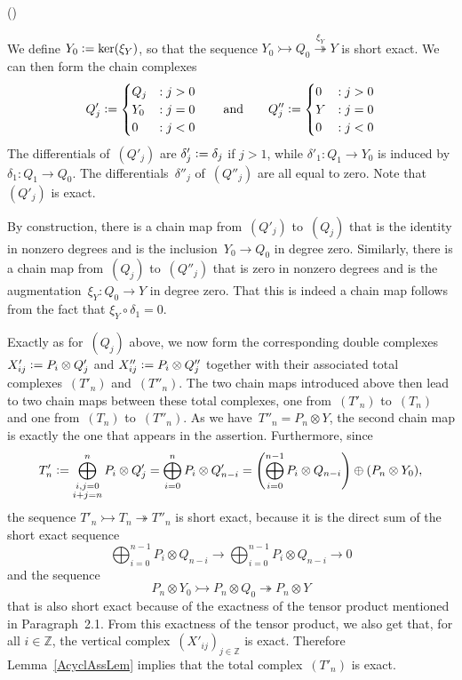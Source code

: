 \documentclass[12pt]{article}
\makeatletter
\newcounter{num}
\newenvironment{pflist}{\begin{list}{(\arabic{num})}{\usecounter{num} \leftmargin0cm \itemindent5pt}}{\end{list}}
\theoremstyle{definition}
\theoremstyle{break}
\renewenvironment{proof}[1][\proofname]{\par
\vspace{-5pt}%
\pushQED{\qed}%
\normalfont
\topsep0pt \partopsep0pt %
\trivlist
\item[\hskip\labelsep
\bfseries
#1\@addpunct{.}]\ignorespaces
}{%
\popQED\endtrivlist\@endpefalse
\addvspace{6pt plus 6pt} %
}
\newcommand{\Z}{\mathbb{Z}}
\renewcommand{\1}{\mathbbm{1}}
\newcommand{\ot}{\mathbin{\otimes}}
\newcommand{\deq}{\vcentcolon =}
\makeatother
\begin{document}
\begin{proof}
\begin{pflist}
\item
We define $Y_0 \deq \ker(\xi_Y)$, so that the sequence
$Y_0 \rightarrowtail Q_0 \overset{\xi_Y}{\twoheadrightarrow} Y$
is short exact. We can then form the chain complexes
\[
Q'_j \deq
\begin{cases}
Q_{j} &: j > 0 \\
Y_0 &: j = 0 \\
0 &: j < 0
\end{cases}
\qquad \text{and} \qquad
Q''_j \deq
\begin{cases}
0 &: j > 0 \\
Y &: j = 0 \\
0 &: j < 0
\end{cases}
\]
The differentials of~$(Q'_j)$ are $\delta'_j \deq \delta_j$ if $j > 1$, while $\delta'_1 \colon Q_1 \to Y_0$ is induced by $\delta_1 \colon Q_1 \to Q_0$. The differentials~$\delta''_j$ of~$(Q''_j)$ are all equal to zero. Note that~$(Q'_j)$ is exact.

By construction, there is a chain map from~$(Q'_j)$ to~$(Q_j)$ that is the identity in nonzero degrees and is the inclusion~$Y_0 \to Q_0$ in degree zero. Similarly, there is a chain map from~$(Q_j)$ to~$(Q''_j)$ that is zero in nonzero degrees and is the augmentation~\mbox{$\xi_Y \colon Q_0 \to Y$} in degree zero. That this is indeed a chain map follows from the fact that $\xi_Y \circ \delta_1 = 0$.

\item
Exactly as for~$(Q_j)$ above, we now form the corresponding double complexes
$X'_{ij} \deq P_i \ot Q'_j$ and $X''_{ij} \deq P_i \ot Q''_j$ together with their associated total complexes~$(T'_n)$ and~$(T''_n)$. The two chain maps introduced above then lead to two chain maps between these total complexes, one from~$(T'_n)$ to~$(T_n)$ and one from~$(T_n)$ to~$(T''_n)$. As we have~$T''_n = P_n \ot Y$, the second chain map is exactly the one that appears in the assertion. Furthermore, since
\[T'_n \deq \bigoplus_{\substack{i,j=0 \\i+j=n}}^n P_{i} \ot Q'_{j} =
\bigoplus_{i=0}^n P_{i} \ot Q'_{n-i} =
\left( \bigoplus_{i=0}^{n-1} P_{i} \ot Q_{n-i} \right) \oplus (P_{n} \ot Y_0),\] the sequence $T'_n \rightarrowtail T_n \twoheadrightarrow T''_n$ is short exact, because it is the direct sum of the short exact sequence
\[\bigoplus_{i=0}^{n-1} P_{i} \ot Q_{n-i} \rightarrow
\bigoplus_{i=0}^{n-1} P_{i} \ot Q_{n-i} \rightarrow 0\]
and the sequence
\[P_{n} \ot Y_0 \rightarrowtail P_{n} \ot Q_0 \twoheadrightarrow P_{n} \ot Y\]
that is also short exact because of the exactness of the tensor product mentioned in Paragraph~2.1. From this exactness of the tensor product, we also get that, for all $i \in \Z$, the vertical complex~$(X'_{ij})_{j \in \Z}$ is exact. Therefore Lemma~\ref{AcyclAssLem} implies that the total complex~$(T'_n)$ is exact.


\end{pflist}
\end{proof}
\end{document}
